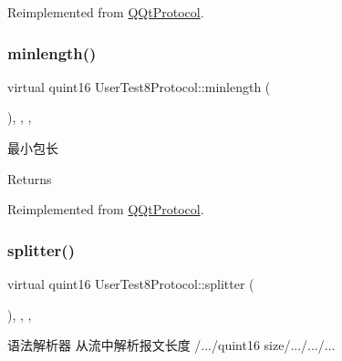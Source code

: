 Reimplemented from \mbox{\hyperlink{class_q_qt_protocol_af41bc3116abbbcfc9af45e151a253ff7}{Q\+Qt\+Protocol}}.

\mbox{\label{class_user_test8_protocol_a8c0fe537872e834829e9507dc1bf3898}} 
\subsubsection{\texorpdfstring{minlength()}{minlength()}}
{\footnotesize\ttfamily virtual quint16 User\+Test8\+Protocol\+::minlength (\begin{DoxyParamCaption}{ }\end{DoxyParamCaption})\hspace{0.3cm}{\ttfamily [inline]}, {\ttfamily [override]}, {\ttfamily [protected]}, {\ttfamily [virtual]}}



最小包长 

\begin{DoxyReturn}{Returns}

\end{DoxyReturn}


Reimplemented from \mbox{\hyperlink{class_q_qt_protocol_a2b00f53d3dd0eed817eeecff422891f3}{Q\+Qt\+Protocol}}.

\mbox{\label{class_user_test8_protocol_abb32ee37a76f7ee7b0a28b65b3abb592}} 
\subsubsection{\texorpdfstring{splitter()}{splitter()}}
{\footnotesize\ttfamily virtual quint16 User\+Test8\+Protocol\+::splitter (\begin{DoxyParamCaption}\item[{const Q\+Byte\+Array \&}]{ }\end{DoxyParamCaption})\hspace{0.3cm}{\ttfamily [inline]}, {\ttfamily [override]}, {\ttfamily [protected]}, {\ttfamily [virtual]}}



语法解析器 从流中解析报文长度 /.../quint16 size/.../.../... 


